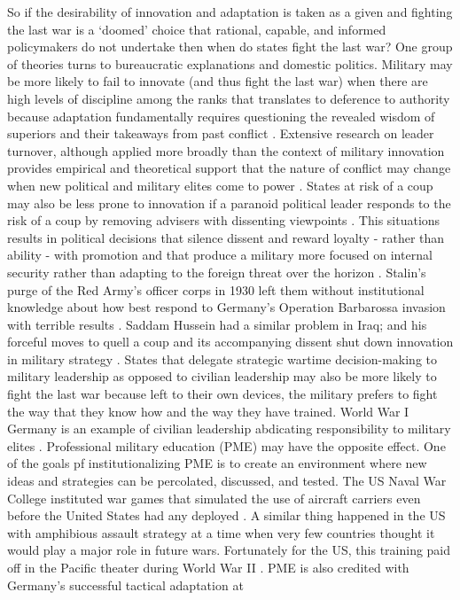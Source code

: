 \documentclass[12pt,letterpaper]{article}
\begin{document}
	So if the desirability of innovation and adaptation is taken as a given and fighting the last war is a `doomed' choice that rational, capable, and informed policymakers do not undertake then when do states fight the last war? One group of theories turns to bureaucratic explanations and domestic politics. Military may be more likely to fail to innovate (and thus fight the last war) when there are high levels of discipline among the ranks that translates to deference to authority because adaptation fundamentally requires questioning the revealed wisdom of superiors and their takeaways from past conflict \citep{knox_conclusioncontinuityrevolution_1996, murray_militaryadaptationwar_2009}. Extensive research on leader turnover, although applied more broadly than the context of military innovation provides empirical and theoretical support that the nature of conflict may change when new political and military elites come to power \citep{wolford_turnovertrapnew_2007, wolford_incumbentssuccessorscrisis_2012, mattes_leadershipturnoverforeign_2015, wolford_warssuccession_2018}. States at risk of a coup may also be less prone to innovation if a paranoid political leader responds to the risk of a coup by removing advisers with dissenting viewpoints \citep{murray_militaryadaptationwar_2009}. This situations results in political decisions that silence dissent and reward loyalty - rather than ability - with promotion \citep{bausch_coupproofingmilitaryinefficiencies_2018} and that produce a military more focused on internal security rather than adapting to the foreign threat over the horizon \citep{narang_civilmilitarypathologiesdefeat_2018}. Stalin's purge of the Red Army's officer corps in 1930 left them without institutional knowledge about how best respond to Germany's Operation Barbarossa invasion with terrible results \citep{habeck_stormsteeldevelopment_2014, glantz_companioncolossusreborn_2005}. Saddam Hussein had a similar problem in Iraq; and his forceful moves to quell a coup and its accompanying dissent shut down innovation in military strategy \citep{hashim_saddamhusayncivilmilitary_2003, woods_iraqiperspectivesproject_2006}. States that delegate strategic wartime decision-making to military leadership as opposed to civilian leadership may also be more likely to fight the last war because left to their own devices, the military prefers to fight the way that they know how and the way they have trained. World War I Germany is an example of civilian leadership abdicating responsibility to military elites \citep{prior_passchendaeleuntoldstory_1996}. Professional military education (PME) may have the opposite effect. One of the goals pf institutionalizing PME is to create an environment where new ideas and strategies can be percolated, discussed, and tested. The US Naval War College instituted war games that simulated the use of aircraft carriers even before the United States had any deployed \citep{spires_imagerealitymaking_1984}. A similar thing happened in the US with amphibious assault strategy at a time when very few countries thought it would play a major role in future wars. Fortunately for the US, this training paid off in the Pacific theater during World War II \citep{millett_amphibiouswaramerican_1996}. PME is also credited with Germany's successful tactical adaptation at 
\end{document}
